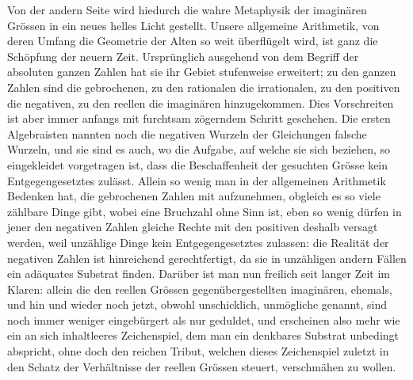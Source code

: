 \documentclass[12pt]{article}
\begin{document}
Von der andern Seite wird hiedurch die wahre Metaphysik der imaginären Grössen in ein neues helles Licht gestellt. Unsere allgemeine Arithmetik, von deren Umfang die Geometrie der Alten so weit überflügelt wird, ist ganz die Schöpfung der neuern Zeit. Ursprünglich ausgehend von dem Begriff der absoluten ganzen Zahlen hat sie ihr Gebiet stufenweise erweitert; zu den ganzen Zahlen sind die gebrochenen, zu den rationalen die irrationalen, zu den positiven die negativen, zu den reellen die imaginären hinzugekommen. Dies Vorschreiten ist aber immer anfangs mit furchtsam zögerndem Schritt geschehen. Die ersten Algebraisten nannten noch die negativen Wurzeln der Gleichungen falsche Wurzeln, und sie sind es auch, wo die Aufgabe, auf welche sie sich beziehen, so eingekleidet vorgetragen ist, dass die Beschaffenheit der gesuchten Grösse kein Entgegengesetztes zulässt. Allein so wenig man in der allgemeinen Arithmetik Bedenken hat, die gebrochenen Zahlen mit aufzunehmen, obgleich es so viele zählbare Dinge gibt, wobei eine Bruchzahl ohne Sinn ist, eben so wenig dürfen in jener den negativen Zahlen gleiche Rechte mit den positiven deshalb versagt werden, weil unzählige Dinge kein Entgegengesetztes zulassen: die Realität der negativen Zahlen ist hinreichend gerechtfertigt, da sie in unzähligen andern Fällen ein adäquates Substrat finden. Darüber ist man nun freilich seit langer Zeit im Klaren: allein die den reellen Grössen gegenübergestellten imaginären, ehemals, und hin und wieder noch jetzt, obwohl unschicklich, unmögliche genannt, sind noch immer weniger eingebürgert als nur geduldet, und erscheinen also mehr wie ein an sich inhaltleeres Zeichenspiel, dem man ein denkbares Substrat unbedingt abspricht, ohne doch den reichen Tribut, welchen dieses Zeichenspiel zuletzt in den Schatz der Verhältnisse der reellen Grössen steuert, verschmähen zu wollen.
\end{document}
